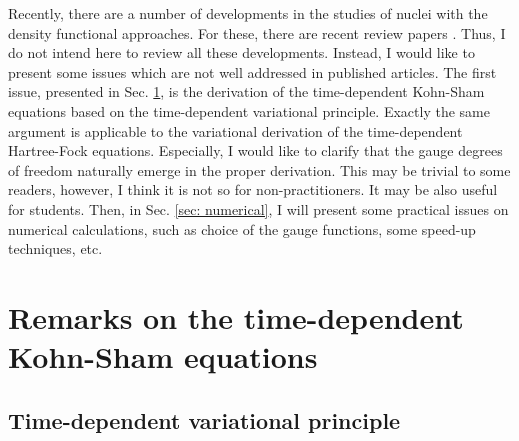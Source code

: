 \documentclass[twoside]{article}
\begin{document}
{Recently, there are a number of developments in the studies of nuclei
with the density functional approaches.
For these, there are 
recent review papers \cite{BHR03,Nak12,Sim12,MRSU14}.
Thus, I do not intend here to review all these developments.
Instead, I would like to present some issues which are not well addressed in
published articles.
The first issue, presented in Sec. \ref{sec: derivation},
is the derivation of the time-dependent
Kohn-Sham equations
based on the time-dependent variational principle.
Exactly the same argument is applicable to the variational derivation of
the time-dependent Hartree-Fock equations.
Especially, I would like to clarify that the gauge degrees of freedom
naturally emerge in the proper derivation.
This may be trivial to some readers,
however, I think it is not so for non-practitioners.
It may be also useful for students.
Then, in Sec. \ref{sec: numerical}, I will present some practical issues
on numerical calculations, such as
choice of the gauge functions, some speed-up techniques, etc.

\section{Remarks on the time-dependent Kohn-Sham equations}
\label{sec: derivation}

\subsection{Time-dependent variational principle}

}
\end{document}
